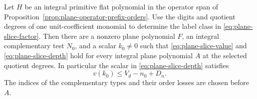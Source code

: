 \begin{lemma}\label{lem:plane-split-polynomial}
Let \(H\) be an integral primitive flat polynomial in the
operator span of Proposition~\ref{prop:plane-operator-prefix-orders}.
Use the digits and quotient degrees of one unit-coefficient
monomial to determine the label class in \eqref{eq:plane-slice-factor}.
Then there
are a nonzero plane polynomial \(F\), an integral complementary
test \(N_0\), and a scalar \(k_0\ne0\) such that
\eqref{eq:plane-slice-value} and \eqref{eq:plane-slice-depth}
hold for every integral plane polynomial \(A\) at the selected
quotient degrees. In particular the scalar in \eqref{eq:plane-slice-depth} satisfies
\[
 v(k_0)\le V_d-n_0+D_n.
\]
The indices of the complementary types and their order losses are chosen before \(A\).
\end{lemma}

